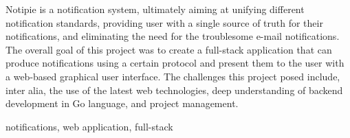 \abstract
Notipie is a notification system,
ultimately aiming at unifying
different notification standards,
providing user with a single source of truth
for their notifications,
and eliminating the need
for the troublesome e-mail notifications.
The overall goal of this project
was to create a full-stack application
that can produce notifications using a certain protocol
and present them to the user
with a web-based graphical user interface.
The challenges this project posed include,
inter alia,
the use of the latest web technologies,
deep understanding of backend development in Go language,
and project management.

\keywords notifications, web application, full-stack
